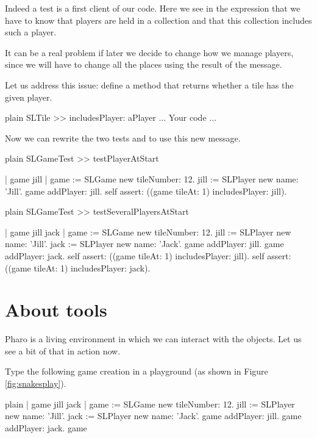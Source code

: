 \documentclass[10pt,twoside,english]{_support/latex/sbabook/sbabook}
\begin{document}
Indeed a test is a first client of our code. Here we see in the expression   that we have to know that players are held in a collection and that this collection includes such a player.

It can be a real problem if later we decide to change how we manage players,
since we will have to change all the places using the result of the  message. 

Let us address this issue: define a method  that returns whether a tile has the given player.

\begin{displaycode}{plain}
SLTile >> includesPlayer: aPlayer
	... Your code ...
\end{displaycode}

 
Now we can rewrite the two tests  and  to use this new message. 

\begin{displaycode}{plain}
SLGameTest >> testPlayerAtStart

	| game jill |
	game := SLGame new tileNumber: 12.
	jill := SLPlayer new name: 'Jill'.
	game addPlayer: jill. 
	self assert: ((game tileAt: 1) includesPlayer: jill).
\end{displaycode}

\begin{displaycode}{plain}
SLGameTest >> testSeveralPlayersAtStart

	| game jill jack |
	game := SLGame new tileNumber: 12.
	jill := SLPlayer new name: 'Jill'.
	jack := SLPlayer new name: 'Jack'.
	game addPlayer: jill.
	game addPlayer: jack.
	self assert: ((game tileAt: 1) includesPlayer: jill).
	self assert: ((game tileAt: 1) includesPlayer: jack).
\end{displaycode}
\section{About tools}
Pharo is a living environment in which we can interact with the objects. Let us see a bit of that in action now.

Type the following game creation in a playground (as shown in Figure \ref{fig:snakesplay}).

\begin{displaycode}{plain}
| game jill jack |
game := SLGame new tileNumber: 12.
jill := SLPlayer new name: 'Jill'.
jack := SLPlayer new name: 'Jack'.
game addPlayer: jill.
game addPlayer: jack.
game 
\end{displaycode}
\end{document}
